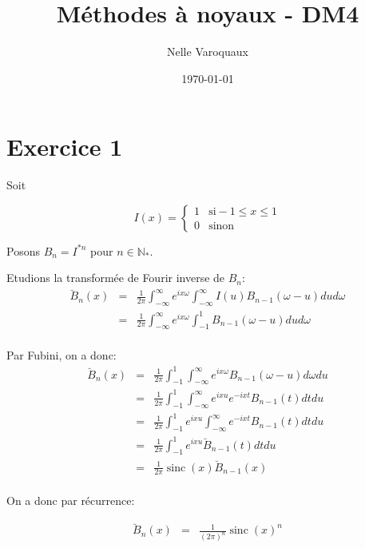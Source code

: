 \documentclass{article}
\date{\today}
\title{Méthodes à noyaux - DM4}
\author{Nelle Varoquaux}
\DeclareMathOperator{\sinc}{sinc}
\begin{document}
\maketitle

\section{Exercice 1}
Soit

\begin{equation*}
I(x) = \begin{cases}
       1 & \mbox{si} -1 \leq x \leq 1 \\
       0 & \mbox{sinon}
       \end{cases}
\end{equation*}

Posons $B_n = I^{*n}$ pour $n \in \mathbb{N}_*$.

Etudions la transformée de Fourir inverse de $B_n$:
\begin{align*}
\breve{B}_n(x) & = & \frac{1}{2 \pi} \int_{- \infty}^{\infty} e^{ix\omega}
	     \int_{- \infty}^{\infty} I(u) B_{n- 1}(\omega - u) du d\omega\\
	   & = & \frac{1}{2 \pi} \int_{- \infty}^{\infty} e^{ix\omega}
		 \int_{- 1}^{1} B_{n- 1}(\omega - u) du d \omega\\
\end{align*}

Par Fubini, on a donc:
\begin{align*}
\breve{B}_n(x) & = & \frac{1}{2 \pi} \int_{- 1}^{1} \int_{- \infty}^{\infty}
	           e^{ix\omega} B_{n - 1}(\omega - u) d\omega du \\
	       & = & \frac{1}{2 \pi} \int_{- 1}^{1} \int_{- \infty}^{\infty}
	           e^{ixu} e^{-ixt }B_{n - 1}(t) dt du \\
	       & = & \frac{1}{2 \pi} \int_{- 1}^{1} e^{ixu}  \int_{- \infty}^{\infty}
	           e^{-ixt }B_{n - 1}(t) dt du \\
	       & = & \frac{1}{2 \pi} \int_{- 1}^{1} e^{ixu} \breve{B}_{n - 1}(t) dt du \\
	       & = & \frac{1}{2 \pi} \sinc(x) \breve{B}_{n - 1}(x) \\
\end{align*}

On a donc par récurrence:

\begin{align*}
\breve{B}_n(x) & = & \frac{1}{(2 \pi)^n} \sinc(x)^n \\
\end{align*}
\end{document}
